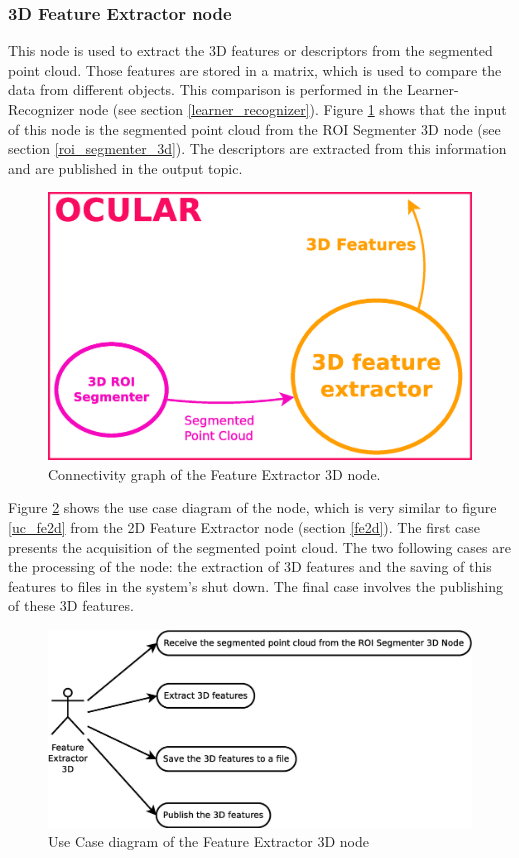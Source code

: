 
\subsubsection{3D Feature Extractor node}
\label{fe3d}
	This node is used to extract the 3D features or descriptors from the segmented point cloud. 
	Those features are stored in a matrix, which is used to compare the data from different objects. 
	This comparison is performed in the Learner-Recognizer node (see section \ref{learner_recognizer}).
	Figure \ref{node_fe3d} shows that the input of this node is the segmented point cloud from the ROI Segmenter 3D node (see section \ref{roi_segmenter_3d}). The descriptors are extracted from this information and are published in the output topic. 
	\\
		\begin{figure}[H]
			\begin{center}
			\includegraphics[width=0.5\linewidth]{img/diagrams/node_fe3d.eps}
			\caption[Feature Extractor 3D node I/O]{Connectivity graph of the Feature Extractor 3D node.}		
			\label{node_fe3d}
			\end{center}
		\end{figure}

	Figure \ref{uc_fe3d} shows the use case diagram of the node, which is very similar to figure \ref{uc_fe2d} from the 2D Feature Extractor node (section \ref{fe2d}). 
	The first case presents the acquisition of the segmented point cloud. 
	The two following cases are the processing of the node: the extraction of 3D features and the saving of this features to files in the system's shut down. 
	The final case involves the publishing of these 3D features. 

	\begin{figure}[H]
		\centering
			\includegraphics[scale=0.4]{img/diagrams/uc_feature_extractor_3d.eps}
			\caption[Use case diagram Feature Extractor 3D node]{Use Case diagram of the Feature Extractor 3D node}
		\label{uc_fe3d}
	\end{figure}

